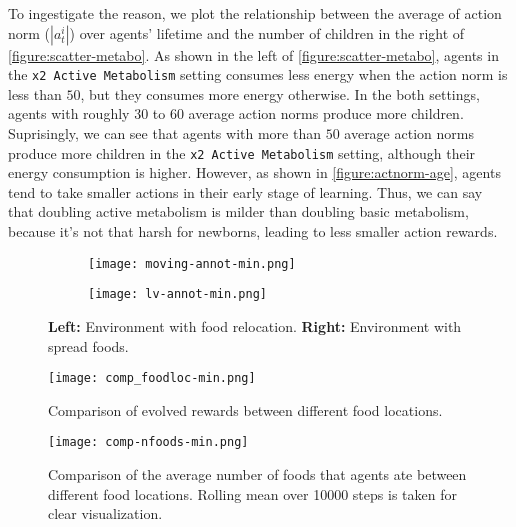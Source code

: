 To ingestigate the reason, we plot the relationship between the average of action norm ($|a_{t}^{i}|$) over agents' lifetime and the number of children in the right of \cref{figure:scatter-metabo}. As shown in the left of \cref{figure:scatter-metabo}, agents in the \texttt{x2 Active Metabolism} setting consumes less energy when the action norm is less than $50$, but they consumes more energy otherwise. In the both settings, agents with roughly $30$ to $60$ average action norms produce more children. Suprisingly, we can see that agents with more than $50$ average action norms produce more children in the \texttt{x2 Active Metabolism} setting, although their energy consumption is higher. However, as shown in \cref{figure:actnorm-age}, agents tend to take smaller actions in their early stage of learning. Thus, we can say that doubling active metabolism is milder than doubling basic metabolism, because it's not that harsh for newborns, leading to less smaller action rewards.

\begin{figure}[t]
  \begin{subfigure}[t]{4cm}
    \centering
    \texttt{[image: moving-annot-min.png]}
  \end{subfigure}
  \begin{subfigure}[t]{4cm}
    \centering
    \texttt{[image: lv-annot-min.png]}
  \end{subfigure}
  \caption{
    \textbf{Left:} Environment with food relocation.
    \textbf{Right:} Environment with spread foods.
  }\label{figure:foodloc}
\end{figure}

\begin{figure}[ht]
  \centering
  \texttt{[image: comp\_foodloc-min.png]}
  \caption{
    Comparison of evolved rewards between different food locations.
  }\label{figure:result-foodloc}
\end{figure}

\begin{figure}[!htb]
  \centering
  \texttt{[image: comp-nfoods-min.png]}
  \caption{
    Comparison of the average number of foods that agents ate between different food locations.
    Rolling mean over 10000 steps is taken for clear visualization.
  }\label{figure:result-ncstd}
\end{figure}

